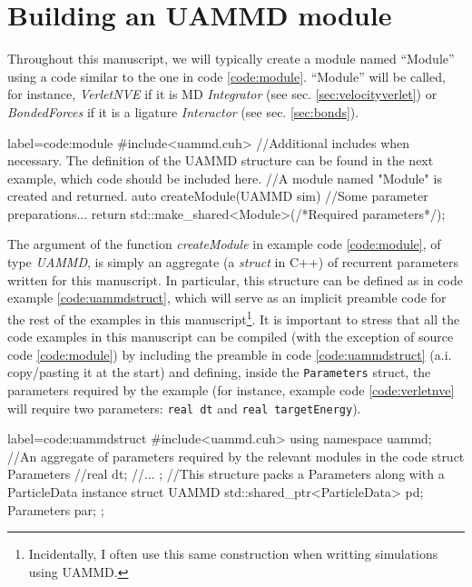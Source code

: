 \documentclass[ twoside,openright,titlepage,numbers=noenddot,%
headinclude,footinclude,cleardoublepage=empty,abstract=on,
BCOR=5mm,paper=a4,fontsize=11pt, dvipsnames
]{scrreprt}
\def\ucpp{uammd_cpp_lexer.py:UAMMDCppLexer -x}
\newcommand{\uammd}{\gls{UAMMD}\xspace}
\begin{document}
\section{Building an UAMMD module}

Throughout this manuscript, we will typically create a module named ``Module'' using a code similar to the one in code \ref{code:module}. ``Module'' will be called, for instance, \emph{VerletNVE} if it is \gls{MD} \emph{Integrator} (see sec. \ref{sec:velocityverlet}) or \emph{BondedForces} if it is a ligature \emph{Interactor} (see sec. \ref{sec:bonds}).

\begin{code2}{label=code:module}
#include<uammd.cuh>
//Additional includes when necessary. The definition of the UAMMD structure can be found in the next example, which code should be included here.
//A module named "Module" is created and returned.
auto createModule(UAMMD sim){
  //Some parameter preparations...
  return std::make_shared<Module>(/*Required parameters*/);
}
\end{code2}

The argument of the function \emph{createModule} in example code \ref{code:module}, of type \emph{UAMMD}, is simply an aggregate (a \emph{struct} in C++) of recurrent parameters written for this manuscript. In particular, this structure can be defined as in code example \ref{code:uammdstruct}, which will serve as an implicit preamble code for the rest of the examples in this manuscript\footnote{Incidentally, I often use this same construction when writting simulations using \uammd.}. It is important to stress that all the code examples in this manuscript can be compiled (with the exception of source code \ref{code:module}) by including the preamble in code \ref{code:uammdstruct} (a.i. copy/pasting it at the start) and defining, inside the \texttt{Parameters} struct, the parameters required by the example (for instance, example code \ref{code:verletnve} will require two parameters: \texttt{real dt} and \texttt{real targetEnergy}).

\begin{code2}
  {label=code:uammdstruct}
#include<uammd.cuh>
using namespace uammd; 
//An aggregate of parameters required by the relevant modules in the code
struct Parameters{
  //real dt;
  //...
};
//This structure packs a Parameters along with a ParticleData instance
struct UAMMD{
  std::shared_ptr<ParticleData> pd;
  Parameters par;
};
\end{code2}
\end{document}
